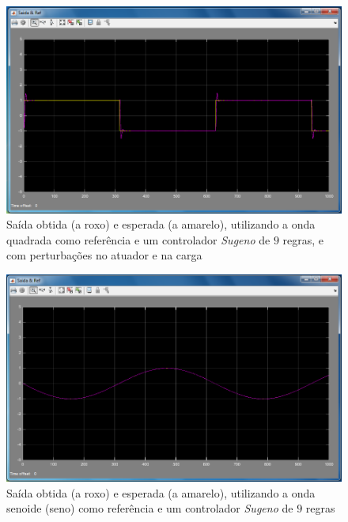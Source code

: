 \documentclass{article}
\begin{document}
\begin{figure}[h]
  \centering
      \includegraphics[scale=0.3]{Images/Sugeno_9_square_actuator_charge.png}
  \caption{Saída obtida (a roxo) e esperada (a amarelo), utilizando a onda quadrada como referência e um controlador \emph{Sugeno} de $9$ regras, e com perturbações no atuador e na carga}
\end{figure}

\clearpage


\begin{figure}[h]
  \centering
      \includegraphics[scale=0.3]{Images/Sugeno_9_sin.png}
  \caption{Saída obtida (a roxo) e esperada (a amarelo), utilizando a onda senoide (seno) como referência e um controlador \emph{Sugeno} de $9$ regras}
\end{figure}
\end{document}
